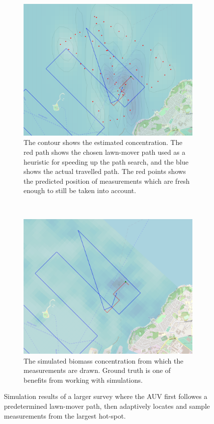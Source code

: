\documentclass[conference]{IEEEtran}
\begin{document}
\begin{figure}[t]
     \centering
     \begin{subfigure}[htb]{\linewidth}
         \centering
         \includegraphics[width=\textwidth]{figures/sim-estimate.png}
         \caption{The contour shows the estimated concentration. The red path shows the chosen lawn-mover path used as a heuristic for speeding up the path search, and the blue shows the actual travelled path. The red points shows the predicted position of measurements which are fresh enough to still be taken into account.}
         \label{fig:sim-estimation}
     \end{subfigure}
     \\
     \begin{subfigure}[htb]{\linewidth}
         \centering
         \includegraphics[width=\textwidth]{figures/sim-gt.png}
         \caption{The simulated biomass concentration from which the measurements are drawn. Ground truth is one of benefits from working with simulations.}
         \label{fig:sim-gt}
     \end{subfigure}
        \caption{Simulation results of a larger survey where the AUV first followes a predetermined lawn-mover path, then adaptively locates and sample measurements from the largest hot-spot.}
        \label{fig:Simulation}
\end{figure}
\end{document}
